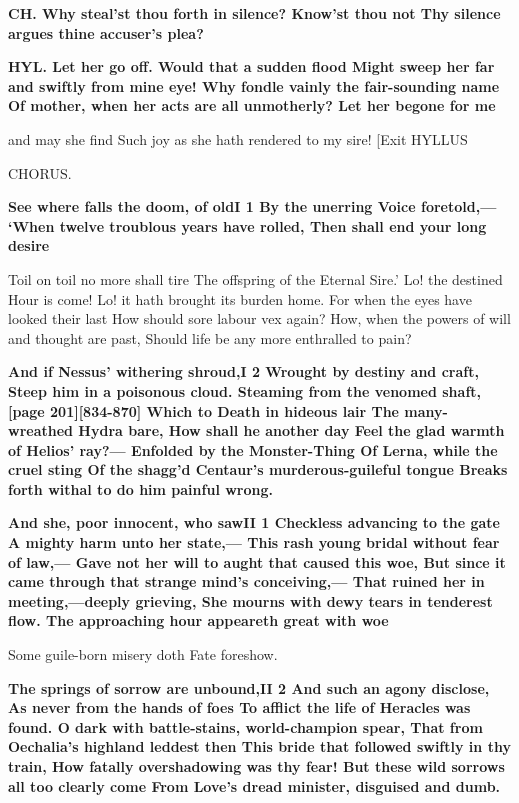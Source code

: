 \documentclass[11pt,letter]{book}
\begin{document}
\par \textbf{CH. Why steal’st thou forth in silence? Know’st thou not Thy silence argues thine accuser’s plea?}
\par 

\par \textbf{HYL. Let her go off. Would that a sudden flood Might sweep her far and swiftly from mine eye! Why fondle vainly the fair-sounding name Of mother, when her acts are all unmotherly? Let her begone for me}
\par   and may she find Such joy as she hath rendered to my sire! [Exit HYLLUS

\par  CHORUS.

\par \textbf{See where falls the doom, of oldI 1 By the unerring Voice foretold,— ‘When twelve troublous years have rolled, Then shall end your long desire}
\par   Toil on toil no more shall tire The offspring of the Eternal Sire.’ Lo! the destined Hour is come! Lo! it hath brought its burden home. For when the eyes have looked their last How should sore labour vex again? How, when the powers of will and thought are past, Should life be any more enthralled to pain?

\par \textbf{And if Nessus’ withering shroud,I 2 Wrought by destiny and craft, Steep him in a poisonous cloud. Steaming from the venomed shaft, [page 201][834-870] Which to Death in hideous lair The many-wreathed Hydra bare, How shall he another day Feel the glad warmth of Helios’ ray?— Enfolded by the Monster-Thing Of Lerna, while the cruel sting Of the shagg’d Centaur’s murderous-guileful tongue Breaks forth withal to do him painful wrong.}
\par 

\par \textbf{And she, poor innocent, who sawII 1 Checkless advancing to the gate A mighty harm unto her state,— This rash young bridal without fear of law,— Gave not her will to aught that caused this woe, But since it came through that strange mind’s conceiving,— That ruined her in meeting,—deeply grieving, She mourns with dewy tears in tenderest flow. The approaching hour appeareth great with woe}
\par   Some guile-born misery doth Fate foreshow.

\par \textbf{The springs of sorrow are unbound,II 2 And such an agony disclose, As never from the hands of foes To afflict the life of Heracles was found. O dark with battle-stains, world-champion spear, That from Oechalia’s highland leddest then This bride that followed swiftly in thy train, How fatally overshadowing was thy fear! But these wild sorrows all too clearly come From Love’s dread minister, disguised and dumb.}
\par 
\end{document}

